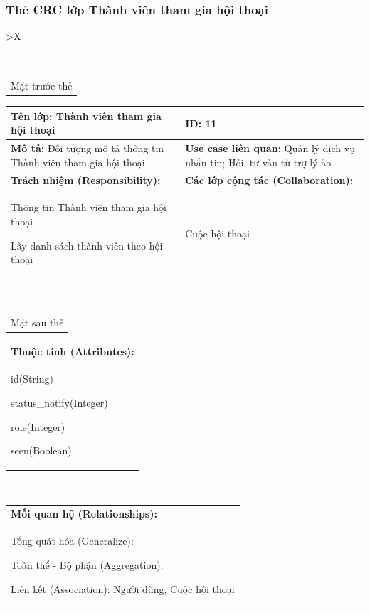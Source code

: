 \newpage

  \subsubsection{Thẻ CRC lớp Thành viên tham gia hội thoại}
  \begin{xltabular}{\textwidth}{
    >{\centering\arraybackslash}X 
  }
  \caption{\bfseries \fontsize{12pt}{0pt}\selectfont Thẻ CRC lớp Tài khoản}
  \\
  \begin{tabularx}{0.9\textwidth}{X}
    Mặt trước thẻ
  \end{tabularx}
  \begin{tabularx}{0.9\textwidth}{|X|X|}
    \hline
    \textbf{Tên lớp:} Thành viên tham gia hội thoại & \textbf{ID:} 11 \\
    \hline
    \textbf{Mô tả:} Đối tượng mô tả thông tin Thành viên tham gia hội thoại & \textbf{Use case liên quan:} Quản lý dịch vụ nhắn tin; Hỏi, tư vấn từ trợ lý ảo \\
    \hline
    \textbf{Trách nhiệm (Responsibility):} & \textbf{Các lớp cộng tác (Collaboration):} \\
    Thông tin Thành viên tham gia hội thoại

    Lấy danh sách thành viên theo hội thoại
    & 
    Cuộc hội thoại 
    \\
    \hline
  \end{tabularx}
  \\ 
  \begin{tabularx}{0.9\textwidth}{X}
    Mặt sau thẻ
  \end{tabularx} 
  \begin{tabularx}{0.9\textwidth}{|X|}
    \hline
    \textbf{Thuộc tính (Attributes):} \\
    id(String) 

    status\_notify(Integer)

    role(Integer)

    seen(Boolean)
    \\
    \hline
  \end{tabularx}
  \\     
  \begin{tabularx}{0.9\textwidth}{|X|}
    \textbf{Mối quan hệ (Relationships):} \\
    Tổng quát hóa (Generalize):  

    Toàn thể - Bộ phận (Aggregation): 
    
    Liên kết (Association): Người dùng, Cuộc hội thoại
    \\
    \hline
  \end{tabularx}
  \end{xltabular}

